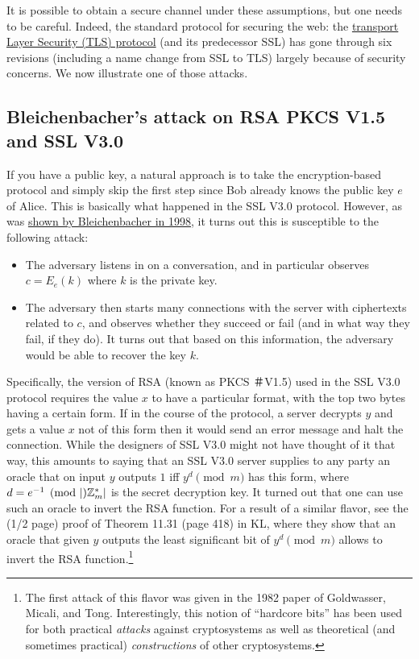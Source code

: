 It is possible to obtain a secure channel under these assumptions, but
one needs to be careful. Indeed, the standard protocol for securing the
web: the \href{https://goo.gl/md9Bsa}{transport Layer Security (TLS)
protocol} (and its predecessor SSL) has gone through six revisions
(including a name change from SSL to TLS) largely because of security
concerns. We now illustrate one of those attacks.

\subsection{Bleichenbacher's attack on RSA PKCS V1.5 and SSL
V3.0}\label{12-Bleichenbachers-attack}

If you have a public key, a natural approach is to take the
encryption-based protocol and simply skip the first step since Bob
already knows the public key \(e\) of Alice. This is basically what
happened in the SSL V3.0 protocol. However, as was
\href{http://archiv.infsec.ethz.ch/education/fs08/secsem/bleichenbacher98.pdf}{shown
by Bleichenbacher in 1998}, it turns out this is susceptible to the
following attack:

\begin{itemize}
\item
  The adversary listens in on a conversation, and in particular observes
  \(c=E_e(k)\) where \(k\) is the private key.
\item
  The adversary then starts many connections with the server with
  ciphertexts related to \(c\), and observes whether they succeed or
  fail (and in what way they fail, if they do). It turns out that based
  on this information, the adversary would be able to recover the key
  \(k\).
\end{itemize}

Specifically, the version of RSA (known as PKCS ＃V1.5) used in the SSL
V3.0 protocol requires the value \(x\) to have a particular format, with
the top two bytes having a certain form. If in the course of the
protocol, a server decrypts \(y\) and gets a value \(x\) not of this
form then it would send an error message and halt the connection. While
the designers of SSL V3.0 might not have thought of it that way, this
amounts to saying that an SSL V3.0 server supplies to any party an
oracle that on input \(y\) outputs \(1\) iff \(y^{d} \pmod{m}\) has this
form, where \(d = e^{-1} \pmod|{\mathbb{Z}}^*_m|\) is the secret decryption key.
It turned out that one can use such an oracle to invert the RSA
function. For a result of a similar flavor, see the (1/2 page) proof of
Theorem 11.31 (page 418) in KL, where they show that an oracle that
given \(y\) outputs the least significant bit of \(y^d \pmod{m}\) allows
to invert the RSA function.\footnote{The first attack of this flavor was
  given in the 1982 paper of Goldwasser, Micali, and Tong.
  Interestingly, this notion of ``hardcore bits'' has been used for both
  practical \emph{attacks} against cryptosystems as well as theoretical
  (and sometimes practical) \emph{constructions} of other cryptosystems.}

